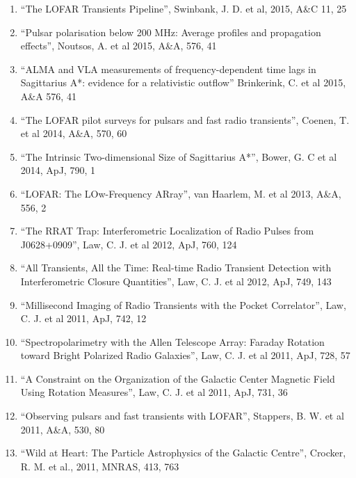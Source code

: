 \documentclass[11pt]{article}
\begin{document}
\begin{enumerate}
    \item ``The LOFAR Transients Pipeline'', Swinbank, J. D. et al, 2015, A\&C 11, 25

    \item ``Pulsar polarisation below 200 MHz: Average profiles and propagation effects'', Noutsos, A. et al 2015, A\&A, 576, 41

    \item ``ALMA and VLA measurements of frequency-dependent time lags in Sagittarius A*: evidence for a relativistic outflow'' Brinkerink, C. et al 2015, A\&A 576, 41

    \item ``The LOFAR pilot surveys for pulsars and fast radio transients'', Coenen, T. et al 2014, A\&A, 570, 60

    \item ``The Intrinsic Two-dimensional Size of Sagittarius A*'', Bower, G. C et al 2014, ApJ, 790, 1

    \item ``LOFAR: The LOw-Frequency ARray'', van Haarlem, M. et al 2013, A\&A, 556, 2

    \item ``The RRAT Trap: Interferometric Localization of Radio Pulses from J0628+0909'', Law, C. J. et al 2012, ApJ, 760, 124

    \item ``All Transients, All the Time: Real-time Radio Transient Detection with Interferometric Closure Quantities'',  Law, C. J. et al 2012, ApJ, 749, 143

    \item ``Millisecond Imaging of Radio Transients with the Pocket Correlator'',  Law, C. J. et al 2011, ApJ, 742, 12

    \item ``Spectropolarimetry with the Allen Telescope Array:  Faraday Rotation toward Bright Polarized Radio Galaxies'',  Law, C. J. et al 2011, ApJ, 728, 57

    \item ``A Constraint on the Organization of the Galactic Center Magnetic Field Using Rotation Measures'',  Law, C. J. et al 2011, ApJ, 731, 36

    \item ``Observing pulsars and fast transients with LOFAR'',  Stappers, B. W. et al 2011, A\&A, 530, 80

    \item ``Wild at Heart: The Particle Astrophysics of the Galactic Centre'',  Crocker, R. M. et al., 2011, MNRAS, 413, 763


\end{enumerate}
\end{document}
